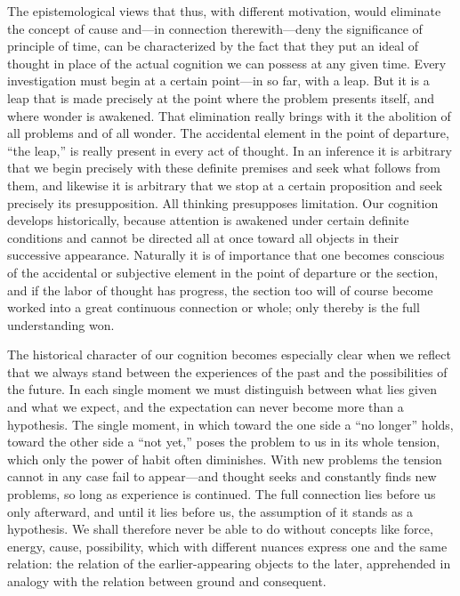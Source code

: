 \documentclass[12pt,a4paper]{book}
\newcommand{\opage}[1]{\marginnote{\footnotesize\textit{[#1]}}}
\begin{document}
The epistemological views that thus, with different motivation, would eliminate
the concept of cause and---in connection therewith---deny the significance of
principle of time, can be characterized by the fact that they put an ideal of
thought in place of the actual cognition we can possess at any given time. Every
investigation must begin at a certain point---in so far, with a leap. But it is a
leap that is made precisely at the point where the problem presents itself, and
where wonder is awakened. That elimination really brings with it the abolition
of all problems and of all wonder. The accidental element in the point of
departure, ``the leap,'' is really present in every act of thought. In an
inference it is arbitrary that we begin precisely with these definite premises
and seek what follows from them, and likewise it is arbitrary that we stop at a
certain proposition and seek precisely its presupposition. All thinking
presupposes limitation. Our cognition develops historically, because attention
is awakened under certain definite conditions and cannot be directed all at once
toward all objects in their successive appearance. Naturally it is of importance
that one becomes conscious of the accidental or subjective element in the point
of departure or the section, and if the labor of thought has progress, the
section too will of course become worked into a great continuous connection or
whole; only thereby is the full understanding won.

\opage{285}The historical character of our cognition becomes especially clear when we
reflect that we always stand between the experiences of the past and the
possibilities of the future. In each single moment we must distinguish between
what lies given and what we expect, and the expectation can never become more
than a hypothesis. The single moment, in which toward the one side a ``no
longer'' holds, toward the other side a ``not yet,'' poses the problem to us in
its whole tension, which only the power of habit often diminishes. With new
problems the tension cannot in any case fail to appear---and thought seeks and
constantly finds new problems, so long as experience is continued. The full
connection lies before us only afterward, and until it lies before us, the
assumption of it stands as a hypothesis. We shall therefore never be able to do
without concepts like force, energy, cause, possibility, which with different
nuances express one and the same relation: the relation of the earlier-appearing
objects to the later, apprehended in analogy with the relation between ground
and consequent.
\end{document}
